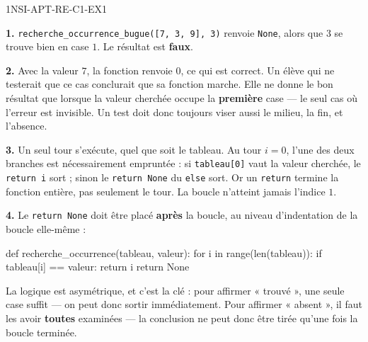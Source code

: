 
\begin{corrige}{1NSI-APT-RE-C1-EX1}

\textbf{1.} \lstinline{recherche_occurrence_bugue([7, 3, 9], 3)} renvoie \lstinline{None},
alors que $3$ se trouve bien en case $1$. Le résultat est \textbf{faux}.

\textbf{2.} Avec la valeur $7$, la fonction renvoie $0$, ce qui est correct. Un élève qui
ne testerait que ce cas conclurait que sa fonction marche. Elle ne donne le bon résultat que
lorsque la valeur cherchée occupe la \textbf{première} case — le seul cas où l'erreur est
invisible. Un test doit donc toujours viser aussi le milieu, la fin, et l'absence.

\textbf{3.} Un seul tour s'exécute, quel que soit le tableau. Au tour $i=0$, l'une des deux
branches est nécessairement empruntée : si \lstinline{tableau[0]} vaut la valeur cherchée,
le \lstinline{return i} sort ; sinon le \lstinline{return None} du \lstinline{else} sort. Or
un \lstinline{return} termine la fonction entière, pas seulement le tour. La boucle
n'atteint jamais l'indice $1$.

\textbf{4.} Le \lstinline{return None} doit être placé \textbf{après} la boucle, au niveau
d'indentation de la boucle elle-même :
\begin{python}
def recherche_occurrence(tableau, valeur):
    for i in range(len(tableau)):
        if tableau[i] == valeur:
            return i
    return None
\end{python}
La logique est asymétrique, et c'est la clé : pour affirmer « trouvé », une seule case
suffit — on peut donc sortir immédiatement. Pour affirmer « absent », il faut les avoir
\textbf{toutes} examinées — la conclusion ne peut donc être tirée qu'une fois la boucle
terminée.

\end{corrige}
